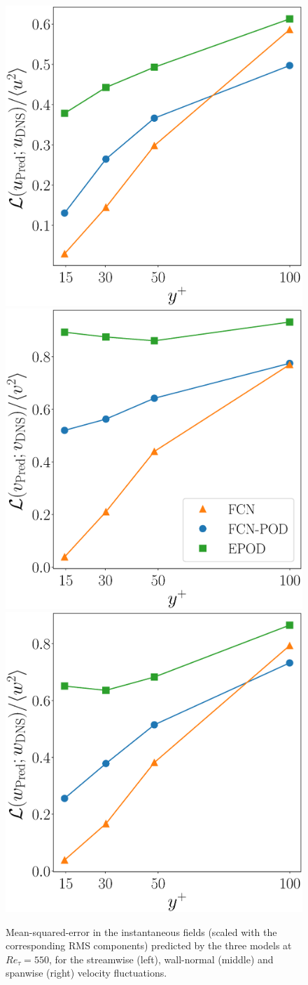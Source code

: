 \begin{figure}
\begin{center}
\includegraphics[width=.32\columnwidth]{Ret550/mse_u550_rms_scale.eps}
\includegraphics[width=.32\columnwidth]{Ret550/mse_v550_rms_scale.eps}
\includegraphics[width=.32\columnwidth]{Ret550/mse_w550_rms_scale.eps}
\end{center}
\caption{\label{fig:loss550} Mean-squared-error in the instantaneous fields (scaled with the corresponding RMS components) predicted by the three models at $Re_{\tau}=550$, for the streamwise (left), wall-normal (middle) and spanwise (right) velocity fluctuations.}
\end{figure}


